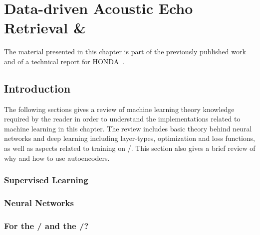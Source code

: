 \chapter{Data-driven Acoustic Echo Retrieval \& }\label{ch:lantern}

 \synopsisChLantern

\mynewline
The material presented in this chapter is part of the previously published work~\cite{di2019mirage} and of a technical report for HONDA\textregistered~.

\section{Introduction}
The following sections gives a review of machine learning theory knowledge required by the reader in order to understand the implementations related to machine learning in this chapter.
The review includes basic theory behind neural networks and deep learning including layer-types, optimization and loss functions, as well as aspects related to training on \RIRdef/.
This section also gives a brief review of why and how to use autoencoders.

\subsection{Supervised Learning}



\subsection{Neural Networks}


\subsection{For the \RIR/ and the \AER/?}


